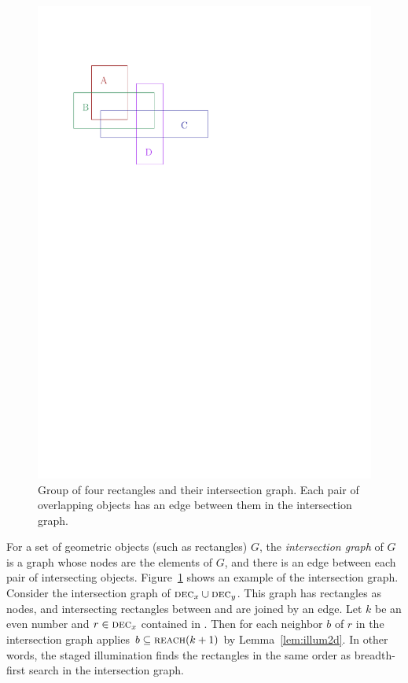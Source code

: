 \documentclass[english,gradu]{tktltiki2018}
\begin{document}
\begin{figure}
	\includegraphics[scale=0.7,page=2]{fig/inter}
	\caption{Group of four rectangles and their intersection graph. Each pair of overlapping objects has an edge between them in the intersection graph.}\label{fig:inter}
\end{figure}

For a set of geometric objects (such as rectangles) $G$, the \emph{intersection graph} of $G$ is a graph whose nodes are the elements of $G$, and there is an edge between each pair of intersecting objects.
Figure~\ref{fig:inter} shows an example of the intersection graph.
Consider the intersection graph of $\textsc{dec}_{x}\cup\textsc{dec}_{y}$.
This graph has rectangles as nodes, and intersecting rectangles between  and  are joined by an edge.
Let $k$ be an even number and $r\in\textsc{dec}_{x}$ contained in .
Then for each neighbor $b$ of $r$ in the intersection graph applies $b\subseteq\textsc{reach}(k+1)$ by Lemma~\ref{lem:illum2d}.
In other words, the staged illumination finds the rectangles in the same order as breadth-first search in the intersection graph.
\end{document}
